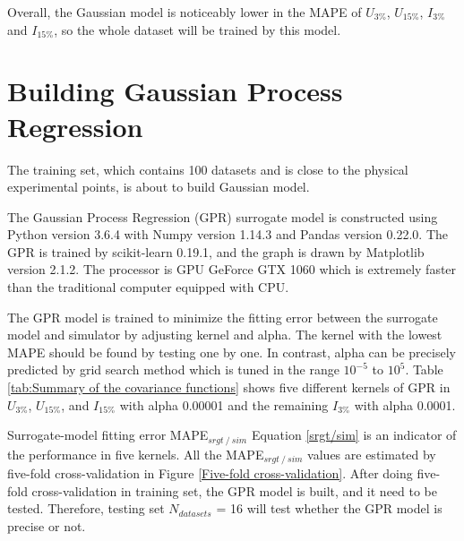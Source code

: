Overall, the Gaussian model is noticeably lower in the MAPE of $U_{3{\%}}$, $U_{15{\%}}$, $I_{3{\%}}$ and $I_{15{\%}}$, so the whole dataset will be trained by this model.

\section{Building Gaussian Process Regression}

The training set, which contains 100 datasets and is close to the physical experimental points, is about to build Gaussian model. 

The Gaussian Process Regression (GPR) surrogate model is constructed using Python version 3.6.4 with Numpy version 1.14.3 and Pandas version 0.22.0. The GPR is trained by scikit-learn 0.19.1, and the graph is drawn by Matplotlib version 2.1.2. The processor is GPU GeForce GTX 1060 which is extremely faster than the traditional computer equipped with CPU.

The GPR model is trained to minimize the fitting error between the surrogate model and simulator by adjusting kernel and alpha. The kernel with the lowest MAPE should be found by testing one by one. In contrast, alpha can be precisely predicted by grid search method which is tuned in the range $10^{-5}$ to $10^{5}$. Table \ref{tab:Summary of the covariance functions} shows five different kernels of GPR in $U_{3{\%}}$, $U_{15{\%}}$, and $I_{15{\%}}$ with alpha 0.00001 and the remaining $I_{3{\%}}$ with alpha 0.0001.

Surrogate-model fitting error MAPE$_{srgt⁄sim}$ Equation \ref{srgt/sim} is an indicator of the performance in five kernels. All the MAPE$_{srgt⁄sim}$ values are estimated by five-fold cross-validation in Figure \ref{Five-fold cross-validation}. After doing five-fold cross-validation in training set, the GPR model is built, and it need to be tested. Therefore, testing set $N_{datasets}$ = 16 will test whether the GPR model is precise or not. 

